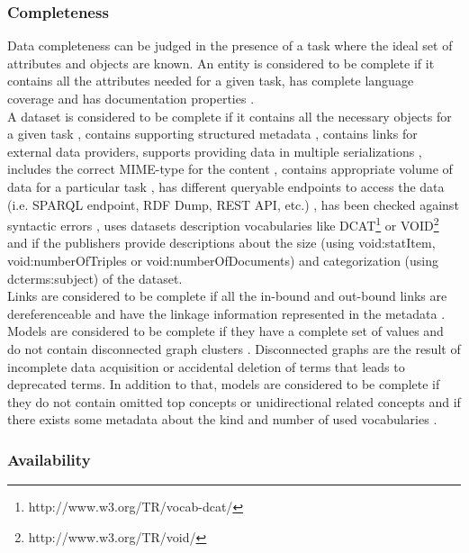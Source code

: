 \documentclass[onecolumn, crcready]{iosart2c}
\begin{document}
 \subsubsection{Completeness}

Data completeness can be judged in the presence of a task where the ideal set of attributes and objects are known. An entity is considered to be complete if it contains all the attributes needed for a given task, has complete language coverage \cite{Mader2012} and has documentation properties \cite{w3c_skos_rec}\cite{Mader2012}.\\ A dataset is considered to be complete if it contains all the necessary objects for a given task \cite{Mendes2012}, contains supporting structured metadata \cite{Hogan2010}, contains links for external data providers, supports providing data in multiple serializations \cite{Framework2012}, includes the correct MIME-type for the content \cite{Hogan2010}, contains appropriate volume of data for a particular task \cite{Framework2012}, has different queryable endpoints to access the data (i.e. SPARQL endpoint, RDF Dump, REST API, etc.) \cite{Framework2012}, has been checked against syntactic errors \cite{Hogan2010}, uses datasets description vocabularies like DCAT\footnote{http://www.w3.org/TR/vocab-dcat/} or VOID\footnote{http://www.w3.org/TR/void/} and if the publishers provide descriptions about the size (using void:statItem, void:numberOfTriples or void:numberOfDocuments) and categorization (using dcterms:subject) of the dataset.\\ Links are considered to be complete if all the in-bound and out-bound links are dereferenceable \cite{Hogan2010}\cite{Mader2012}\cite{Gueret2012} and have the linkage information represented in the metadata \cite{Hogan2010}.\\ Models are considered to be complete if they have a complete set of values \cite{Mader2012} and do not contain disconnected graph clusters \cite{Mader2012}. Disconnected graphs are the result of incomplete data acquisition or accidental deletion of terms that leads to deprecated terms. In addition to that, models are considered to be complete if they do not contain omitted top concepts or unidirectional related concepts \cite{Hogan2010} and if there exists some metadata about the kind and number of used vocabularies \cite{Framework2012}.

\subsubsection{Availability}
\end{document}
